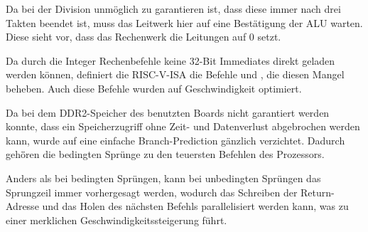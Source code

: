 Da bei der Division unm\"oglich zu garantieren ist, dass diese immer nach drei
Takten beendet ist, muss das Leitwerk hier auf eine Best\"atigung der ALU
warten. Diese sieht vor, dass das Rechenwerk die Leitungen 
auf 0 setzt.


Da durch die Integer Rechenbefehle keine 32-Bit Immediates direkt geladen werden
k\"onnen, definiert die RISC-V-ISA die Befehle  und , die
diesen Mangel beheben. Auch diese Befehle wurden auf Geschwindigkeit optimiert.


Da bei dem DDR2-Speicher des benutzten Boards nicht garantiert werden
konnte, dass ein Speicherzugriff ohne Zeit- und Datenverlust abgebrochen
werden kann, wurde auf eine einfache Branch-Prediction g\"anzlich verzichtet.
Dadurch geh\"ören die bedingten Spr\"unge zu den teuersten Befehlen des
Prozessors.



Anders als bei bedingten Spr\"ungen, kann bei unbedingten Spr\"ungen das
Sprungzeil immer vorhergesagt werden, wodurch das Schreiben der Return-Adresse
und das Holen des n\"achsten Befehls parallelisiert werden kann, was zu einer
merklichen Geschwindigkeitssteigerung f\"uhrt.


